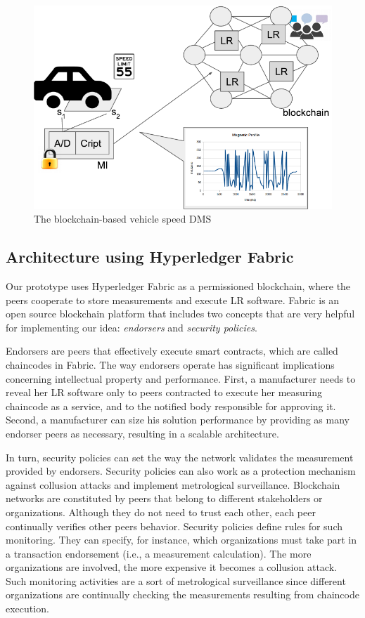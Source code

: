 \documentclass[journal]{IEEEtran}
\begin{document}
\begin{figure}[!t]
\centering
\includegraphics[width=.45\textwidth]{speedmeter} %
\caption{The blockchain-based vehicle speed DMS}
\label{f:speedmeter}
\end{figure}

\subsection{Architecture using Hyperledger Fabric}
Our prototype uses Hyperledger Fabric \cite{Androulaki2018} as a permissioned blockchain, where the peers cooperate to store measurements and execute LR software.
Fabric is an open source blockchain platform that includes two concepts that are very helpful for implementing our idea: \emph{endorsers} and \emph{security policies}.

Endorsers are peers that effectively execute smart contracts, which are called chaincodes in Fabric.
The way endorsers operate has significant implications concerning intellectual property and performance.
First, a manufacturer needs to reveal her LR software only to peers contracted to execute her measuring chaincode as a service, and to the notified body responsible for approving it.
Second, a manufacturer can size his solution performance by providing as many endorser peers as necessary, resulting in a scalable architecture.

In turn, security policies can set the way the network validates the measurement provided by endorsers.
Security policies can also work as a protection mechanism against collusion attacks and implement metrological surveillance.
Blockchain networks are constituted by peers that belong to different stakeholders or organizations.
Although they do not need to trust each other, each peer continually verifies other peers behavior.
Security policies define rules for such monitoring.
They can specify, for instance, which organizations must take part in a transaction endorsement (i.e., a measurement calculation).
The more organizations are involved, the more expensive it becomes a collusion attack.
Such monitoring activities are a sort of metrological surveillance since different organizations are continually checking the measurements resulting from chaincode execution.
\end{document}
